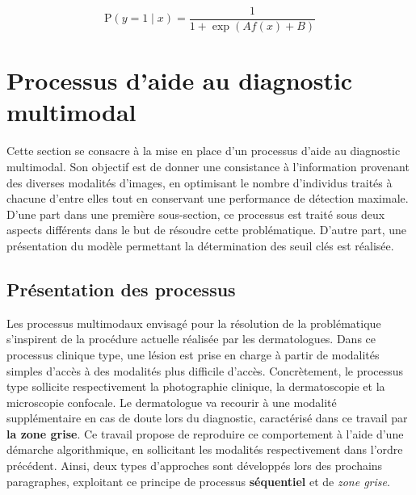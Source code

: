 \begin{equation}
    \mathrm{P}(y=1 \mid x)=\frac{1}{1+\exp (A f(x)+B)}
    \label{eq:sigmoid_calibration}
\end{equation}

\clearpage

\section{Processus d'aide au diagnostic multimodal}
Cette section se consacre à la mise en place d'un processus d'aide au diagnostic multimodal. Son objectif est de donner une consistance à l'information provenant des diverses modalités d'images, en optimisant le nombre d'individus traités à chacune d'entre elles tout en conservant une performance de détection maximale. D'une part dans une première sous-section, ce processus est traité sous deux aspects différents dans le but de résoudre cette problématique. D'autre part, une présentation du modèle permettant la détermination des seuil clés est réalisée.

\subsection{Présentation des processus}
Les processus multimodaux envisagé pour la résolution de la problématique s'inspirent de la procédure actuelle réalisée par les dermatologues. Dans ce processus clinique type, une lésion est prise en charge à partir de modalités simples d'accès à des modalités plus difficile d'accès. Concrètement, le processus type sollicite respectivement la photographie clinique, la dermatoscopie et la microscopie confocale. Le dermatologue va recourir à une modalité supplémentaire en cas de doute lors du diagnostic, caractérisé dans ce travail par \textbf{la zone grise}. Ce travail propose de reproduire ce comportement à l'aide d'une démarche algorithmique, en sollicitant les modalités respectivement dans l'ordre précédent. Ainsi, deux types d'approches sont développés lors des prochains paragraphes, exploitant ce principe de processus \textbf{séquentiel} et de \textit{zone grise}.\par

